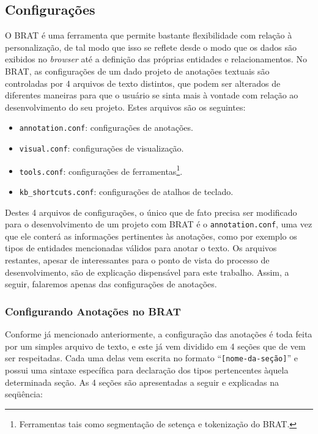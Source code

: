 \documentclass[11pt]{report}
\newcommand{\quotes}[1]{``#1''}
\begin{document}
\subsection{Configurações}

\indent\indent O BRAT é uma ferramenta que permite bastante flexibilidade com relação à personalização, de tal modo que isso se reflete desde
o modo que os dados são exibidos no \textit{browser} até a definição das próprias entidades e relacionamentos. No BRAT, as configurações de um dado projeto de anotações
textuais são controladas por 4 arquivos de texto distintos, que podem ser alterados de diferentes maneiras para que o usuário se sinta mais à vontade com relação ao desenvolvimento do
seu projeto. Estes arquivos são os seguintes:

\begin{itemize}
  \item \texttt{annotation.conf}: configurações de anotações.
  \item \texttt{visual.conf}: configurações de visualização.
  \item \texttt{tools.conf}: configurações de ferramentas\footnote[11]{Ferramentas tais como segmentação de setença e tokenização do BRAT.}.
  \item \texttt{kb\_shortcuts.conf}: configurações de atalhos de teclado.
\end{itemize}

Destes 4 arquivos de configurações, o único que de fato precisa ser modificado para o desenvolvimento de um projeto com BRAT é o \texttt{annotation.conf}, uma vez que ele
conterá as informações pertinentes às anotações, como por exemplo os tipos de entidades mencionadas válidos para anotar o texto. Os arquivos restantes, apesar de interessantes
para o ponto de vista do processo de desenvolvimento, são de explicação dispensável para este trabalho. Assim, a seguir, falaremos apenas das configurações de anotações.

\subsubsection{Configurando Anotações no BRAT}

\indent\indent Conforme já mencionado anteriormente, a configuração das anotações é toda feita por um simples arquivo de texto, e este já vem dividido em 4 seções que de vem ser
respeitadas. Cada uma delas vem escrita no formato \quotes{\texttt{[nome-da-seção]}} e possui uma sintaxe específica para declaração dos tipos pertencentes àquela
determinada seção. As 4 seções são apresentadas a seguir e explicadas na seqüência:
\end{document}
